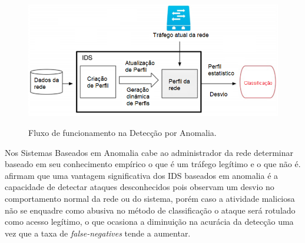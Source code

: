 \begin{figure}[H]
\centering
\caption{Fluxo de funcionamento na Detecção por Anomalia.} \includegraphics[width=12cm,height=\textwidth,keepaspectratio]{figs/anomalia.png}
\newline {}\label{fig:anomalia}
\end{figure}

Nos Sistemas Baseados em Anomalia cabe ao administrador da rede determinar baseado em seu conhecimento empírico o que é um tráfego legítimo e o que não é.  afirmam que uma vantagem significativa dos IDS baseados em anomalia é a capacidade de detectar ataques desconhecidos pois observam um desvio no comportamento normal da rede ou do sistema, porém caso a atividade maliciosa não se enquadre como abusiva no método de classificação o ataque será rotulado como acesso legítimo, o que ocasiona a diminuição na acurácia da detecção uma vez que a taxa de \textit{false-negatives} tende a aumentar.


















